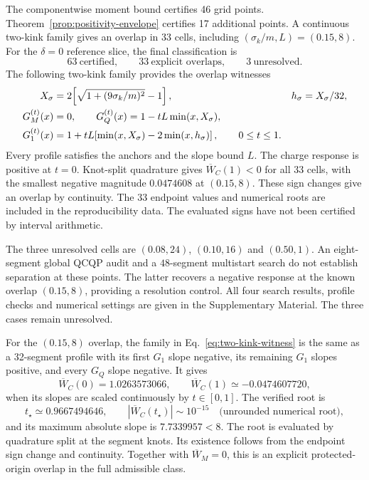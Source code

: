 \documentclass[12pt]{iopjournal}
\theoremstyle{definition}
\theoremstyle{remark}
\begin{document}
The componentwise moment bound certifies 46 grid points. Theorem~\ref{prop:positivity-envelope} certifies 17 additional points. A continuous two-kink family gives an overlap in 33 cells, including $(\sigma_k/m,L)=(0.15,8)$. For the $\delta=0$ reference slice, the final classification is
\begin{equation}
\boxed{63\ \text{certified},\qquad
33\ \text{explicit overlaps},\qquad
3\ \text{unresolved}.}
\label{eq:status-63-33-3}
\end{equation}
The following two-kink family provides the overlap witnesses
\begin{align}
X_\sigma&=2\!\left[\sqrt{1+(9\sigma_k/m)^2}-1\right],
&h_\sigma&=X_\sigma/32,\notag\\
G_M^{(t)}(x)&=0,\qquad
G_Q^{(t)}(x)=1-tL\min(x,X_\sigma),\notag\\
G_1^{(t)}(x)&=1+tL\!\left[\min(x,X_\sigma)-2\min(x,h_\sigma)\right],
\qquad 0\le t\le1.
\label{eq:two-kink-witness}
\end{align}
Every profile satisfies the anchors and the slope bound $L$. The charge response is positive at $t=0$. Knot-split quadrature gives $\overline W_C(1)<0$ for all 33 cells, with the smallest negative magnitude $0.0474608$ at $(0.15,8)$. These sign changes give an overlap by continuity. The 33 endpoint values and numerical roots are included in the reproducibility data. The evaluated signs have not been certified by interval arithmetic.

The three unresolved cells are $(0.08,24)$, $(0.10,16)$ and $(0.50,1)$. An eight-segment global QCQP audit and a $48$-segment multistart search do not establish separation at these points. The latter recovers a negative response at the known overlap $(0.15,8)$, providing a resolution control. All four search results, profile checks and numerical settings are given in the Supplementary Material. The three cases remain unresolved.

For the $(0.15,8)$ overlap, the family in Eq.~\eqref{eq:two-kink-witness} is the same as a 32-segment profile with its first $G_1$ slope negative, its remaining $G_1$ slopes positive, and every $G_Q$ slope negative. It gives
\begin{equation}
\overline W_C(0)=1.0263573066,
\qquad
\overline W_C(1)\simeq-0.0474607720,
\end{equation}
when its slopes are scaled continuously by $t\in[0,1]$. The verified root is
\begin{equation}
t_\star\simeq0.9667494646,
\qquad
|\overline W_C(t_\star)|\sim10^{-15}\quad\text{(unrounded numerical root)},
\end{equation}
and its maximum absolute slope is $7.7339957<8$. The root is evaluated by quadrature split at the segment knots. Its existence follows from the endpoint sign change and continuity. Together with $\overline W_M=0$, this is an explicit protected-origin overlap in the full admissible class.
\end{document}
